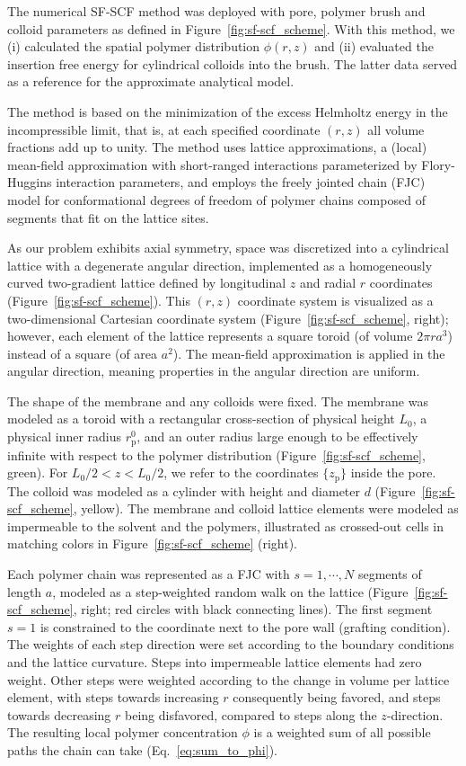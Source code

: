 \documentclass[10pt, a4paper, twocolumn]{article}
\begin{document}
The numerical SF-SCF method was deployed with pore, polymer brush and colloid parameters as defined in Figure~\ref{fig:sf-scf_scheme}.
With this method, we (i) calculated the spatial polymer distribution $\phi(r,z)$ and (ii) evaluated the insertion free energy for cylindrical colloids into the brush.
The latter data served as a reference for the approximate analytical model.

The method is based on the minimization of the excess Helmholtz energy in the incompressible limit, that is, at each specified coordinate $(r,z)$ all volume fractions add up to unity.
The method uses lattice approximations, a (local) mean-field approximation with short-ranged interactions parameterized by Flory-Huggins interaction parameters, and employs the freely jointed chain (FJC) model for conformational degrees of freedom of polymer chains composed of segments that fit on the lattice sites. 

As our problem exhibits axial symmetry, space was discretized into a cylindrical lattice with a degenerate angular direction,
implemented as a homogeneously curved two-gradient lattice defined by longitudinal $z$ and radial $r$ coordinates (Figure~\ref{fig:sf-scf_scheme}).
This $(r,z)$ coordinate system is visualized as a two-dimensional Cartesian coordinate system (Figure~\ref{fig:sf-scf_scheme}, right); however, each element of the lattice represents a square toroid (of volume $2 \pi r a^3$) instead of a square (of area $a^2$).
The mean-field approximation is applied in the angular direction, meaning properties in the angular direction are uniform.

The shape of the membrane and any colloids were fixed.
The membrane was modeled as a toroid with a rectangular cross-section of physical height $L_0$, a physical inner radius $r_{\text{p}}^0$, and an outer radius large enough to be effectively infinite with respect to the polymer distribution (Figure~\ref{fig:sf-scf_scheme}, green).
For $L_0/2 < z < L_0/2$, we refer to the coordinates $\{z_\text{p}\}$ inside the pore.
The colloid was modeled as a cylinder with height and diameter $d$ (Figure~\ref{fig:sf-scf_scheme}, yellow).
The membrane and colloid lattice elements were modeled as impermeable to the solvent and the polymers, illustrated as crossed-out cells in matching colors in Figure~\ref{fig:sf-scf_scheme} (right).

Each polymer chain was represented as a FJC with $s=1, \cdots, N$ segments of length $a$, modeled as a step-weighted random walk on the lattice (Figure~\ref{fig:sf-scf_scheme}, right; red circles with black connecting lines).
The first segment $s=1$ is constrained to the coordinate next to the pore wall (grafting condition).
The weights of each step direction were set according to the boundary conditions and the lattice curvature.
Steps into impermeable lattice elements had zero weight.
Other steps were weighted according to the change in volume per lattice element, with steps towards increasing $r$ consequently being favored, and steps towards decreasing $r$ being disfavored, compared to steps along the $z$-direction.
The resulting local polymer concentration $\phi$ is a weighted sum of all possible paths the chain can take (Eq.~\eqref{eq:sum_to_phi}).
\end{document}
